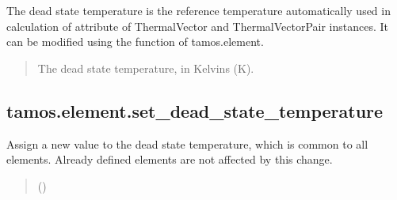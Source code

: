 \documentclass[letterpaper,10pt,english]{sphinxmanual}
\begin{document}
\begin{fulllineitems}
\label{\detokenize{generated/tamos.element.get_dead_state_temperature:tamos.element.get_dead_state_temperature}}
\pysigstartsignatures
{}
\pysigstopsignatures
\sphinxAtStartPar
The dead state temperature is the reference temperature automatically used in calculation of attribute  of
ThermalVector and ThermalVectorPair instances.
It can be modified using the  function of tamos.element.
\begin{quote}\begin{description}
\sphinxAtStartPar
The dead state temperature, in Kelvins (K).

\end{description}\end{quote}

\end{fulllineitems}


\sphinxstepscope


\subsection{tamos.element.set\_dead\_state\_temperature}
\label{\detokenize{generated/tamos.element.set_dead_state_temperature:tamos-element-set-dead-state-temperature}}\label{\detokenize{generated/tamos.element.set_dead_state_temperature::doc}}

\begin{fulllineitems}
\label{\detokenize{generated/tamos.element.set_dead_state_temperature:tamos.element.set_dead_state_temperature}}
\pysigstartsignatures
{}
\pysigstopsignatures
\sphinxAtStartPar
Assign a new value to the dead state temperature, which is common to all elements.
Already defined elements are not affected by this change.
\begin{quote}\begin{description}
\sphinxAtStartPar
{} (\sphinxstyleliteralemphasis{\sphinxupquote{, }}) \textendash{} 

\end{description}\end{quote}

\end{fulllineitems}
\end{document}
